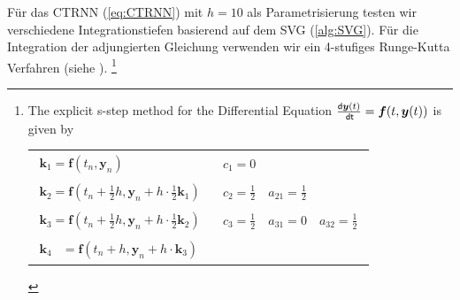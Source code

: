 \documentclass[a4paper, 12pt]{scrartcl}
\newcommand{\dt}{\thinspace \mathsf{dt}}
\begin{document}
Für das CTRNN (\ref{eq:CTRNN}) mit $h=10$ als Parametrisierung 
testen wir verschiedene Integrationstiefen basierend auf dem SVG (\ref{alg:SVG}).
Für die Integration der adjungierten Gleichung verwenden wir ein 4-stufiges Runge-Kutta Verfahren
(siehe \cite{num_ODEs}). \footnote{
    The explicit s-step method for the Differential Equation 
    $\frac{\mathsf{d}\bm{y}(t)}{\dt}= \bm{f}(t,\bm{y}(t))$ is given by
    \begin{center}
        \begin{tabular}{l | l}
            $\begin{aligned}
                \bm{k}_1 
                = 
                \bm{f}(t_n, \bm{y}_n)
            \end{aligned}$
            &
            $\begin{aligned}
                c_1 = 0
            \end{aligned}$
            \\
            $\begin{aligned}
                \bm{k}_2 
                =
                \bm{f}
                \left(
                    t_n + \frac{1}{2} h, \bm{y}_n + h \cdot  \frac{1}{2} \bm{k}_1
                \right)
            \end{aligned}$
            &
            $\begin{aligned}
                c_2 = \frac{1}{2}
                \quad
                a_{21} = \frac{1}{2}
            \end{aligned}$
            \\
            $\begin{aligned}
                \bm{k}_3 
                =
                \bm{f}
                \left(
                    t_n + \frac{1}{2} h, \bm{y}_n + h \cdot  \frac{1}{2} \bm{k}_2
                \right)
            \end{aligned}$
            &
            $\begin{aligned}
                c_3 = \frac{1}{2}
                \quad
                a_{31} = 0
                \quad
                a_{32} = \frac{1}{2}
            \end{aligned}$
            \\
            $\begin{aligned}
                \bm{k}_4 
                &=
                \bm{f}
                \left(
                    t_n +h , \bm{y}_n + h \cdot  \bm{k}_3
                \right)
            \end{aligned}$

\end{tabular}
\end{center}}
\end{document}
